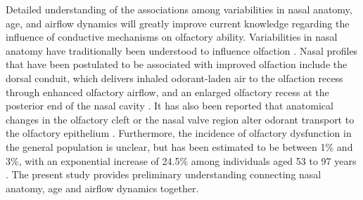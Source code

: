 Detailed understanding of the associations among variabilities in nasal anatomy, age, and airflow dynamics will greatly improve current knowledge regarding the influence of conductive mechanisms on olfactory ability. Variabilities in nasal 
anatomy have traditionally been understood to influence olfaction \cite{Eiting2015, Craven2007}. Nasal profiles that have been postulated to be associated with improved olfaction include the dorsal conduit, which delivers inhaled odorant-laden air to the olfaction recess through enhanced olfactory airflow, and an enlarged olfactory recess at the posterior end of the nasal cavity \cite{Eiting2015, Craven2007, Eiting2014}. It has also been reported that anatomical changes in the olfactory cleft or the nasal valve region alter odorant transport to the olfactory epithelium \cite{Zhao2004a}. Furthermore, the incidence of olfactory dysfunction in the general population is unclear, but has been estimated to be between 1\% and 3\%, with an exponential increase of 24.5\% among individuals aged 53 to 97 years \cite{Landis2004, Braemerson2004, Wysocki1989, Hoffman1998, Murphy2002}. The present study provides preliminary understanding connecting nasal anatomy, age and airflow dynamics together.
